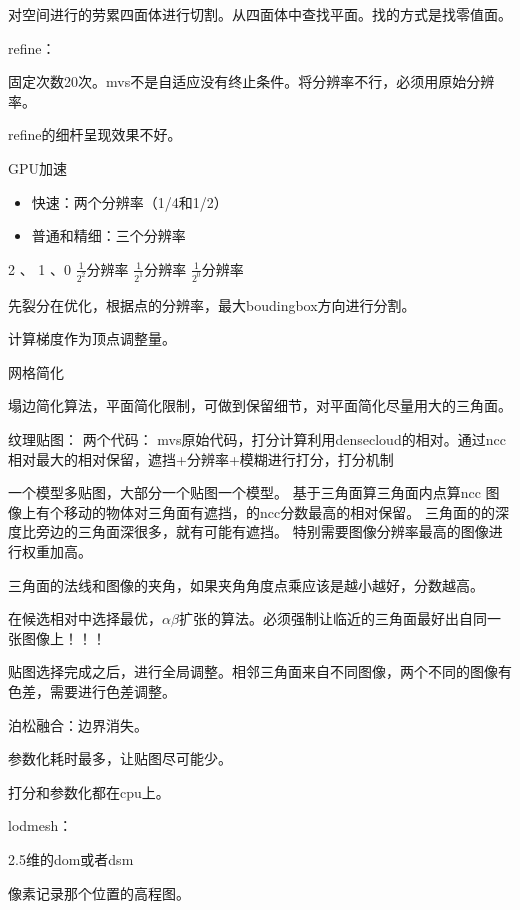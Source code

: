 对空间进行的劳累四面体进行切割。从四面体中查找平面。找的方式是找零值面。


refine：

固定次数20次。mvs不是自适应没有终止条件。将分辨率不行，必须用原始分辨率。

refine的细杆呈现效果不好。

GPU加速

\begin{itemize}
	\item 快速：两个分辨率（1/4和1/2）
	\item 普通和精细：三个分辨率
\end{itemize}

2 、 1 、0
$\frac{1}{2^2}$分辨率
$\frac{1}{2^1}$分辨率
$\frac{1}{2^0}$分辨率

先裂分在优化，根据点的分辨率，最大boudingbox方向进行分割。

计算梯度作为顶点调整量。


网格简化

塌边简化算法，平面简化限制，可做到保留细节，对平面简化尽量用大的三角面。


纹理贴图：
两个代码：
mvs原始代码，打分计算利用densecloud的相对。通过ncc相对最大的相对保留，遮挡+分辨率+模糊进行打分，打分机制

一个模型多贴图，大部分一个贴图一个模型。
基于三角面算三角面内点算ncc
图像上有个移动的物体对三角面有遮挡，的ncc分数最高的相对保留。
三角面的的深度比旁边的三角面深很多，就有可能有遮挡。
特别需要图像分辨率最高的图像进行权重加高。

三角面的法线和图像的夹角，如果夹角角度点乘应该是越小越好，分数越高。

在候选相对中选择最优，$\alpha \beta$扩张的算法。必须强制让临近的三角面最好出自同一张图像上！！！ 

贴图选择完成之后，进行全局调整。相邻三角面来自不同图像，两个不同的图像有色差，需要进行色差调整。

泊松融合：边界消失。

参数化耗时最多，让贴图尽可能少。

打分和参数化都在cpu上。

lodmesh：


2.5维的dom或者dsm


像素记录那个位置的高程图。